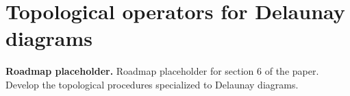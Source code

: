 \chapter{Topological operators for Delaunay diagrams}

\noindent\textbf{Roadmap placeholder.}
Roadmap placeholder for section 6 of the paper. Develop the topological
procedures specialized to Delaunay diagrams.
